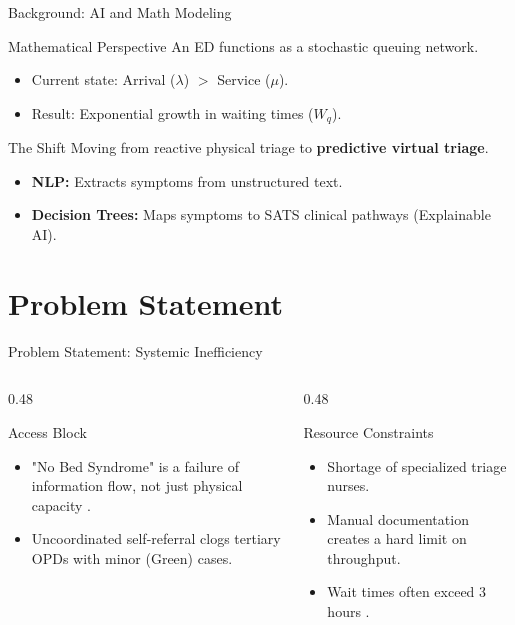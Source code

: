 \documentclass[aspectratio=169,12pt]{beamer}
\begin{document}
	\begin{frame}{Background: AI and Math Modeling}
		\begin{block}{Mathematical Perspective}
			An ED functions as a stochastic queuing network.
			\begin{itemize}
				\item Current state: Arrival ($\lambda$) $>$ Service ($\mu$).
				\item Result: Exponential growth in waiting times ($W_q$).
			\end{itemize}
		\end{block}
		
		\begin{block}{The Shift}
			Moving from reactive physical triage to \textbf{predictive virtual triage}.
			\begin{itemize}
				\item \textbf{NLP:} Extracts symptoms from unstructured text.
				\item \textbf{Decision Trees:} Maps symptoms to SATS clinical pathways (Explainable AI).
			\end{itemize}
		\end{block}
	\end{frame}
	
	\section{Problem Statement }
	
	\begin{frame}{Problem Statement: Systemic Inefficiency}
		\begin{columns}[T]
			\begin{column}{0.48\textwidth}
				\begin{block}{Access Block}
					\begin{itemize}
						\item "No Bed Syndrome" is a failure of information flow, not just physical capacity \citep{ReachAlliance2026}.
						\item Uncoordinated self-referral clogs tertiary OPDs with minor (Green) cases.
					\end{itemize}
				\end{block}
			\end{column}
			
			\begin{column}{0.48\textwidth}
				\begin{block}{Resource Constraints}
					\begin{itemize}
						\item Shortage of specialized triage nurses.
						\item Manual documentation creates a hard limit on throughput.
						\item Wait times often exceed 3 hours \citep{Asante2019}.
					\end{itemize}
				\end{block}
			\end{column}
		\end{columns}
	\end{frame}
	
\end{document}
